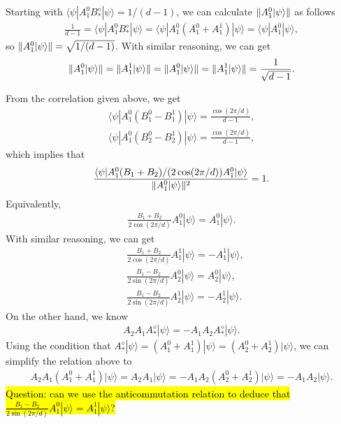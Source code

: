 \documentclass[11pt,letterpaper]{article}
\newcommand{\ket}[1]{|#1\rangle}
\newcommand{\bra}[1]{\langle#1|}
\DeclarePairedDelimiter{\norm}{\lVert}{\rVert}
\newcommand{\1}{\mathbb{1}}
\theoremstyle{definition}
\begin{document}
Starting with $\bra{\psi} A_1^0 B_\ast^\diamond \ket{\psi} = 1/(d-1)$, we can calculate $\norm{A_1^0 \ket{\psi}}$ as
follows
\begin{align}
	\frac{1}{d-1} = \bra{\psi} A_1^0 B_\ast^\diamond \ket{\psi} = \bra{\psi} A_1^0(A_1^0+A_1^1) \ket{\psi} = \bra{\psi} A_1^0 \ket{\psi},
\end{align}
so $\norm{A_1^0 \ket{\psi}} = \sqrt{1/(d-1)}$. With similar reasoning, we can get
\begin{align}
	\norm{A_1^0 \ket{\psi}} = \norm{A_1^1 \ket{\psi}} =\norm{A_1^0 \ket{\psi}} = \norm{A_1^1 \ket{\psi}} = \frac{1}{\sqrt{d-1}}.
\end{align}

 From the correlation given above, we get 
 \begin{align}
 	\bra{\psi} A_1^0 (B_1^0 - B_1^1) \ket{\psi} = \frac{\cos(2\pi/d)}{d-1},\\
	\bra{\psi} A_1^0 (B_2^0 - B_2^1) \ket{\psi} = \frac{\cos(2\pi/d)}{d-1},
 \end{align}
which implies that 
\begin{align}
	\frac{\bra{\psi} A_1^0 (B_1 + B_2)/(2\cos(2\pi/d)) A_1^0 \ket{\psi}}{\norm{A_1^0 \ket{\psi}}^2} = 1.
\end{align}
Equivalently,
\begin{align}
	\frac{B_1+B_2}{2 \cos(2 \pi/d)} A_1^0 \ket{\psi} = A_1^0 \ket{\psi}.
\end{align}
With similar reasoning, we can get
\begin{align}
	&\frac{B_1+B_2}{2 \cos(2 \pi/d)} A_1^1 \ket{\psi} = -A_1^1 \ket{\psi},\\
	&\frac{B_1-B_2}{2 \sin(2 \pi/d)} A_2^0 \ket{\psi} = A_2^0 \ket{\psi},\\
	&\frac{B_1-B_2}{2 \sin(2 \pi/d)} A_2^1 \ket{\psi} = -A_2^1 \ket{\psi}.
\end{align}
On the other hand, we know
\begin{align}
	A_2A_1 A_\ast^\diamond \ket{\psi} = -A_1A_2 A_\ast^\diamond \ket{\psi}.
\end{align}
Using the condition that $A_\ast^\diamond \ket{\psi} = (A_1^0 + A_1^1)\ket{\psi} = (A_2^0 + A_2^1) \ket{\psi}$, we 
can simplify the relation above to
\begin{align}
A_2A_1 (A_1^0+A_1^1) \ket{\psi} = A_2A_1\ket{\psi} = -A_1A_2 (A_2^0+A_2^1) \ket{\psi} = -A_1A_2 \ket{\psi}.
\end{align}
\hl{Question: can we use the anticommutation relation to deduce that $\frac{B_1-B_2}{2 \sin(2 \pi/d)} A_1^0 \ket{\psi} = A_1^1 \ket{\psi}$?}
\end{document}
